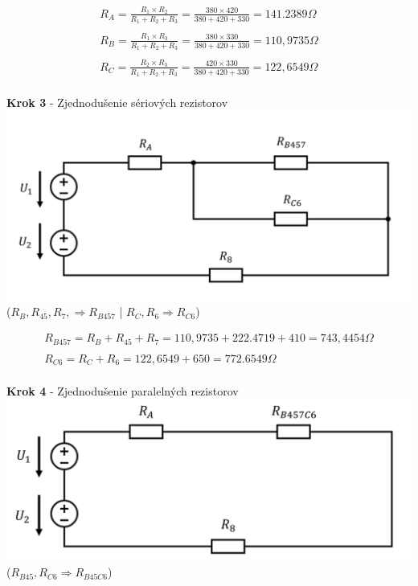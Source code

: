 \begin{gather*}
R_A = \frac{R_1 \times R_2}{R_1 + R_2 + R_3} =
\frac{380 \times 420}{380 + 420 + 330}=
141.2389 \Omega \\\\
R_B = \frac{R_1 \times R_3}{R_1 + R_2 + R_3} =
\frac{380 \times 330}{380 + 420 + 330} =
110,9735 \Omega \\\\
R_C = \frac{R_2 \times R_3}{R_1 + R_2 + R_3} =
\frac{420 \times 330}{380 + 420 + 330} =
122,6549 \Omega \\\
\end{gather*}

\begin{center}
\textbf{Krok 3} - Zjednodušenie sériových rezistorov
\includegraphics[scale=0.5,keepaspectratio]{fig/c3.png} \\
($R_B, R_45, R_7, \Rightarrow R_{B457}$ | $R_C, R_6 \Rightarrow R_{C6}$)
\end{center}

\begin{gather*}
R_{B457} = R_B + R_45 + R_7 =
110,9735 + 222.4719 + 410 =
743,4454 \Omega
\\\\
R_{C6} = R_C + R_6 =
122,6549 + 650 =
772.6549 \Omega
\\\
\end{gather*}

\begin{center}
\textbf{Krok 4} - Zjednodušenie paralelných rezistorov \\
\includegraphics[scale=0.5,keepaspectratio]{fig/c4.png} \\
($R_{B45}, R_{C6} \Rightarrow R_{B45C6}$)
\end{center}

